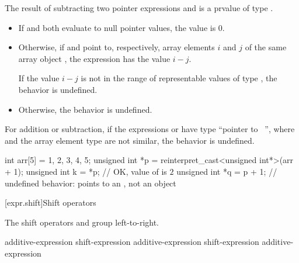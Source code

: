 \pnum
{}%
%
The result of subtracting two pointer expressions  and 
is a prvalue of type .
\begin{itemize}
\item If  and  both evaluate to null pointer values,
the value is 0.
\item Otherwise, if  and  point to, respectively,
array elements $i$ and $j$
of the same array object ,
the expression  has the value $i - j$.
\begin{note}
If the value $i - j$
is not in the range of representable values
of type ,
the behavior is undefined.
\end{note}
\item Otherwise, the behavior is undefined.
\end{itemize}

\pnum
For addition or subtraction, if the expressions  or  have
type ``pointer to \cv{}~'', where  and the array element type
are not similar, the behavior is undefined.
\begin{example}
\begin{codeblock}
int arr[5] = {1, 2, 3, 4, 5};
unsigned int *p = reinterpret_cast<unsigned int*>(arr + 1);
unsigned int k = *p;            // OK, value of  is $2$
unsigned int *q = p + 1;        // undefined behavior:  points to an , not an  object
\end{codeblock}
\end{example}

[expr.shift]{Shift operators}

\pnum
{}%
%
%
%
%
%
The shift operators \tcode{<<} and \tcode{>>} group left-to-right.

%
%
%
%
%
\begin{bnf}
\br
    additive-expression\br
    shift-expression \terminal{<<} additive-expression\br
    shift-expression \terminal{>>} additive-expression
\end{bnf}

